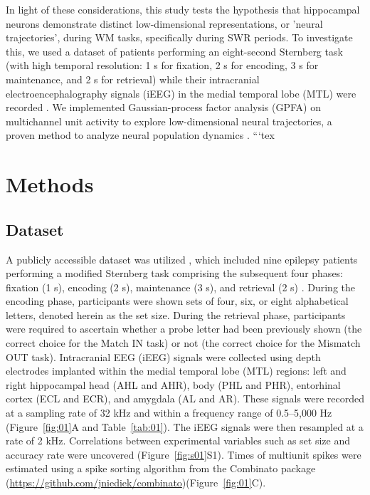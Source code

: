 \documentclass[final,3p,times,twocolumn]{elsarticle}
\begin{document}
\indent
In light of these considerations, this study tests the hypothesis that hippocampal neurons demonstrate distinct low-dimensional representations, or 'neural trajectories', during WM tasks, specifically during SWR periods. To investigate this, we used a dataset of patients performing an eight-second Sternberg task (with high temporal resolution: 1 s for fixation, 2 s for encoding, 3 s for maintenance, and 2 s for retrieval) while their intracranial electroencephalography signals (iEEG) in the medial temporal lobe (MTL) were recorded \cite{boran_dataset_2020}. We implemented Gaussian-process factor analysis (GPFA) on multichannel unit activity to explore low-dimensional neural trajectories, a proven method to analyze neural population dynamics \cite{yu_gaussian-process_2009}.
\label{sec:introduction}```tex
\section{Methods}
\subsection{Dataset}
A publicly accessible dataset was utilized \cite{boran_dataset_2020}, which included nine epilepsy patients performing a modified Sternberg task comprising the subsequent four phases: fixation (1 s), encoding (2 s), maintenance (3 s), and retrieval (2 s) \cite{boran_dataset_2020}. During the encoding phase, participants were shown sets of four, six, or eight alphabetical letters, denoted herein as the set size. During the retrieval phase, participants were required to ascertain whether a probe letter had been previously shown (the correct choice for the Match IN task) or not (the correct choice for the Mismatch OUT task). Intracranial EEG (iEEG) signals were collected using depth electrodes implanted within the medial temporal lobe (MTL) regions: left and right hippocampal head (AHL and AHR), body (PHL and PHR), entorhinal cortex (ECL and ECR), and amygdala (AL and AR). These signals were recorded at a sampling rate of 32 kHz and within a frequency range of 0.5--5,000 Hz (Figure~\ref{fig:01}A and Table~\ref{tab:01}). The iEEG signals were then resampled at a rate of 2 kHz. Correlations between experimental variables such as set size and accuracy rate were uncovered (Figure~\ref{fig:s01}S1). Times of multiunit spikes were estimated using a spike sorting algorithm \cite{niediek_reliable_2016} from the Combinato package (\url{https://github.com/jniediek/combinato})(Figure~\ref{fig:01}C).
\end{document}
